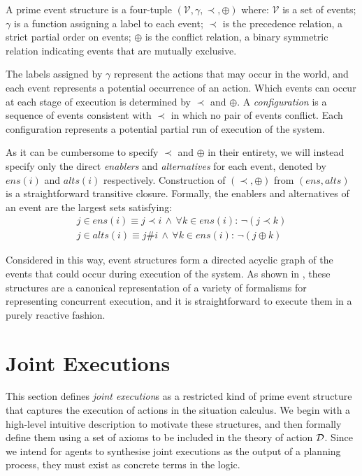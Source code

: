 \begin{defnL}
 A prime event structure is a
four-tuple $(\mathcal{V},\gamma,\prec,\oplus)$ where: $\mathcal{V}$
is a set of events; $\gamma$ is a function assigning a label to each
event; $\prec$ is the precedence relation, a strict partial order
on events; $\oplus$ is the conflict relation, a binary symmetric
relation indicating events that are mutually exclusive. 
\end{defnL}
The labels assigned by $\gamma$ represent the actions that may occur
in the world, and each event represents a potential occurrence of
an action. Which events can occur at each stage of execution is determined
by $\prec$ and $\oplus$. A \emph{configuration} is a sequence of
events consistent with $\prec$ in which no pair of events conflict.
Each configuration represents a potential partial run of execution
of the system.

As it can be cumbersome to specify $\prec$ and $\oplus$ in their
entirety, we will instead specify only the direct \emph{enablers}
and \emph{alternatives} for each event, denoted by $ens(i)$ and $alts(i)$
respectively. Construction of $(\prec,\oplus)$ from $(ens,alts)$
is a straightforward transitive closure. Formally, the enablers and
alternatives of an event are the largest sets satisfying:\begin{gather*}
j\in ens(i)\equiv j\prec i\,\wedge\,\forall k\in ens(i):\,\neg(j\prec k)\\
j\in alts(i)\equiv j\#i\,\wedge\,\forall k\in ens(i):\,\neg(j\oplus k)\end{gather*}


Considered in this way, event structures form a directed acyclic graph
of the events that could occur during execution of the system. As
shown in \citep{pratt91modeling_conc_with_geom}, these structures
are a canonical representation of a variety of formalisms for representing
concurrent execution, and it is straightforward to execute them in
a purely reactive fashion.


\section{Joint Executions\label{sec:JointExec:JEs}}

This section defines \emph{joint execution}s as a restricted kind
of prime event structure that captures the execution of actions in
the situation calculus. We begin with a high-level intuitive description
to motivate these structures, and then formally define them using
a set of axioms to be included in the theory of action $\mathcal{D}$. Since
we intend for agents to synthesise joint executions as the output
of a planning process, they must exist as concrete terms in the logic.

